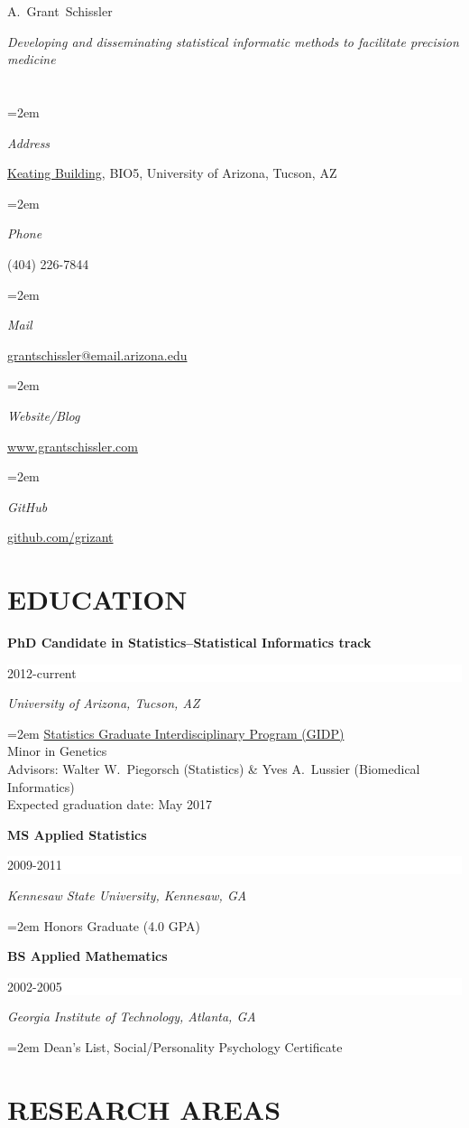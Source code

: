 \documentclass[paper=a4,fontsize=11pt]{scrartcl} %
\newlength{\spacebox}
\newcommand{\sepspace}{\vspace*{1em}}		%
\newcommand{\MyName}[1]{ %
		\LARGE \usefont{OT1}{phv}{b}{n} \hfill #1
		\par \normalsize \normalfont}
\newcommand{\MySlogan}[1]{ %
		\large \usefont{OT1}{phv}{m}{n}\hfill \textit{#1}
		\par \normalsize \normalfont}
\newcommand{\NewPart}[2]{\section*{\uppercase{#1} #2 }}
\newcommand{\PersonalEntry}[2]{
		\noindent\hangindent=2em\hangafter=0 %
		\parbox{\spacebox}{        %
		\textit{#1}}		       %
		\hspace{1.5em} #2 \par}    %
\newcommand{\EducationEntry}[4]{
		\noindent \textbf{#1} \hfill      %
		\colorbox{White}{%
			\parbox{6em}{%
			\hfill\color{Black}#2}} \par  %
		\noindent \textit{#3} \par        %
		\noindent\hangindent=2em\hangafter=0 \small #4 %
		\normalsize \par \vspace{-7pt}}
\begin{document}
 


\MyName{A.~Grant~Schissler}
\vspace{5pt}
\textit{Developing and disseminating statistical informatic methods to facilitate precision medicine}
\vspace{-20pt}

\NewPart{}{}
\vspace{-8pt}
\PersonalEntry{Address}{\href{https://www.google.com/maps/place/Thomas+W.+Keating+Bioresearch+Building/@32.237991,-110.947283,15z/data=!4m2!3m1!1s0x0:0x30f9668cb910d410}{Keating Building}, BIO5, University of Arizona, Tucson, AZ}
\PersonalEntry{Phone}{(404) 226-7844}
\PersonalEntry{Mail}{\href{mailto:grantschissler@email.arizona.edu}{grantschissler@email.arizona.edu}}
\PersonalEntry{Website/Blog}{\href{http://www.grantschissler.com}{www.grantschissler.com}}
\PersonalEntry{GitHub}{\href{https://github.com/grizant}{github.com/grizant}}
\vspace{-7pt}
\NewPart{Education}{}
\vspace{-7pt}
\EducationEntry{PhD Candidate in Statistics--Statistical Informatics track}{2012-current}{University of Arizona, Tucson, AZ}{\href{http://stat.arizona.edu}{Statistics Graduate Interdisciplinary Program (GIDP)}\\Minor in Genetics \\Advisors: Walter W.~Piegorsch (Statistics) \& Yves A.~Lussier (Biomedical Informatics) \\Expected graduation date: May 2017} 
\sepspace

\EducationEntry{MS Applied Statistics}{2009-2011}{Kennesaw State University, Kennesaw, GA}{Honors Graduate (4.0 GPA)}
\sepspace

\EducationEntry{BS Applied Mathematics}{2002-2005}{Georgia Institute of Technology, Atlanta, GA}{Dean's List, Social/Personality Psychology Certificate}

\NewPart{Research areas}{}
\vspace{-7pt}
\end{document}
